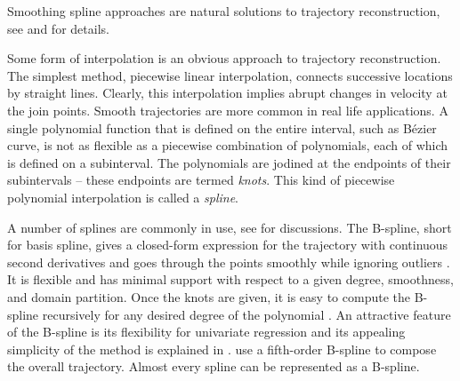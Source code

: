 Smoothing spline approaches are natural solutions to trajectory reconstruction, see 
\eg \cite{eubank2004simple} and \cite{durbin2012time} for details. 

Some form of interpolation is an obvious approach to trajectory reconstruction. The simplest method, piecewise linear interpolation, connects successive locations by straight lines. Clearly, this interpolation implies abrupt changes in velocity at the join points. Smooth trajectories are more common in real life applications. A single polynomial function that is defined on the entire interval, such as B\'ezier curve, is not as flexible as a piecewise combination of polynomials, each of which is defined on a subinterval. The polynomials are jodined at the endpoints of their subintervals -- these endpoints are termed \textit{knots}. This kind of piecewise polynomial interpolation is called a \textit{spline}. 


A number of splines are commonly in use, see \cite{esl2009} for discussions. The B-spline, short for basis spline, gives a closed-form expression for the trajectory with continuous second derivatives and goes through the points smoothly while ignoring outliers \citep{komoriya1989trajectory, ben2004geometric}. It is flexible and has minimal support with respect to a given degree, smoothness, and domain partition. Once the knots are given, it is easy to compute the B-spline recursively for any desired degree of the polynomial \citep{de1978practical, cox1982practical}. An attractive feature of the B-spline is its flexibility for univariate regression and its appealing simplicity of the method is explained in \citep{dierckx1995curve, eilers1996flexible}. \cite{gasparetto2007new} use a fifth-order B-spline to compose the overall trajectory. Almost every spline can be represented as a B-spline. 

